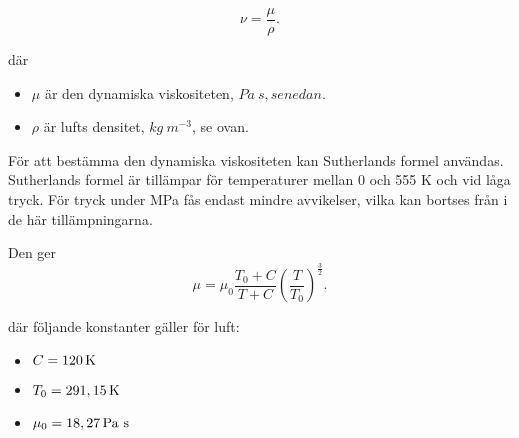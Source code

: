 \begin{equation}
\nu = \frac {\mu} {\rho}.
\end{equation}

där 
\begin{itemize}
\item[] $\mu$ är den dynamiska viskositeten, $\unit{Pa~s}, se nedan.$
\item[] $\rho$ är lufts densitet, $\unit{kg~m^{-3}}$, se ovan.\\
\end{itemize}

För att bestämma den dynamiska viskositeten kan Sutherlands formel användas. Sutherlands formel är tillämpar för temperaturer mellan 0 och 555 K och vid låga tryck. För tryck under \unit[3,45]{MPa} fås endast mindre avvikelser, vilka kan bortses från i de här tillämpningarna.\cite{sutherlandsformula}

Den ger  
\begin{equation}
{\mu} = {\mu}_0 \frac {T_0+C} {T + C} \left (\frac {T} {T_0} \right )^{\frac{3}{2}}.
\end{equation}

där följande konstanter gäller för luft:
\begin{itemize}
\item[] $C=\unit[120]{K}$
\item[] $T_0=\unit[291,15]{K}$
\item[] $\mu_0=\unit[18,27]{Pa~s}$
\end{itemize}



